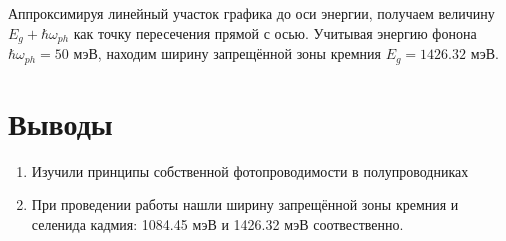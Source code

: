 \documentclass[a4paper, 12pt]{article}
\begin{document}
    Аппроксимируя линейный участок графика до оси энергии, получаем величину $E_g+\hbar\omega_{ph}$ как точку пересечения прямой с осью. Учитывая энергию фонона $\hbar\omega_{ph}=50$ мэВ, находим ширину запрещённой зоны кремния $E_g=1426.32$ мэВ.
    \section{Выводы}
    \begin{enumerate}
        \item Изучили принципы собственной фотопроводимости в полупроводниках
        \item При проведении работы нашли ширину запрещённой зоны кремния и селенида кадмия: 1084.45 мэВ и 1426.32 мэВ соотвественно.
    \end{enumerate}
    
\end{document}
